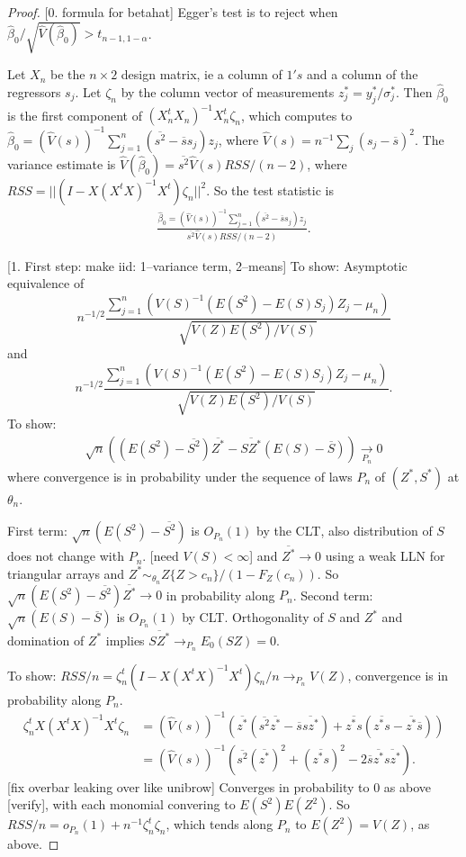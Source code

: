 \documentclass{article}
\newcommand{\E}{E}
\renewcommand{\P}{P}
\newcommand{\V}{V}
\newcommand{\mean}[1]{\overline{#1}}
\newcommand{\sel}[1]{#1^*}
\begin{document}
\begin{proof}

  [0. formula for betahat]
  Egger's test is to reject when $\hat{\beta}_0/\sqrt{\hat{\V}(\hat{\beta}_0)} > t_{n-1,1-\alpha}$.
  
  Let $X_n$ be the $n\times 2$ design matrix, ie a column of $1's$ and
  a column of the regressors $s_j$. Let $\zeta_n$ by the column vector
  of measurements $\sel z_j=\sel y_j/\sel\sigma_j$. Then
  $\hat{\beta}_0$ is the first component of
  $(X_n^tX_n)^{-1}X_n^t\zeta_n$, which computes to
  $\hat{\beta}_0=(\hat{\V}(s))^{-1}\sum_{j=1}^n(\mean{s^2}-\mean{s}s_j)z_j$,
  where $\hat{\V}(s)=n^{-1}\sum_j(s_j-\mean{s})^2$.  The variance
  estimate is
  $\hat{\V}(\hat{\beta}_0)=\mean{s^2}\hat{\V}(s)RSS/(n-2)$, where
  $RSS=||(I-X(X^tX)^{-1}X^t)\zeta_n||^2$. So the test statistic is
  \begin{align}
    \frac{\hat{\beta}_0=(\hat{\V}(s))^{-1}\sum_{j=1}^n(\mean{s^2}-\mean{s}s_j)z_j}{\mean{s^2}\hat{\V}(s)RSS/(n-2)}.
  \end{align}
  
  [1. First step: make iid: 1--variance term, 2--means]
  To show: Asymptotic equivalence of
  \[
    n^{-1/2}\frac{\sum_{j=1}^n\left(\V(S)^{-1}(\E(S^2)-\E(S)S_j)Z_j-\mu_n\right)}{\sqrt{\V(Z)\E(S^2)/\V(S)}}
    \]
  and
  \[
    n^{-1/2}\frac{\sum_{j=1}^n\left(\V(S)^{-1}(\E(S^2)-\E(S)S_j)Z_j-\mu_n\right)}{\sqrt{\V(Z)\E(S^2)/\V(S)}}.
  \]
  To show:
  \begin{align}
    \sqrt{n}\left(\left(\E(S^2)-\mean{S^2}\right)\mean{\sel{Z}} - \mean{S\sel{Z}}\left(\E(S)-\mean{S}\right)\right) \underset{P_n}{\to} 0
  \end{align}
  where convergence is in probability under the sequence of laws $\P_n$ of $(\sel Z,\sel S)$ at $\theta_n$.

  First term: $\sqrt{n}\left(\E(S^2)-\mean{S^2}\right)$ is $O_{P_n}(1)$
  by the CLT, also distribution of $S$ does not change with $P_n$. [need
  $V(S)<\infty$] and $\mean{\sel{Z}}\to 0$ using a weak LLN for
  triangular arrays and
  $\sel Z \sim_{\theta_n} Z\{Z>c_n\}/(1-F_Z(c_n))$. So
  $\sqrt{n}\left(\E(S^2)-\mean{S^2}\right)\mean{\sel{Z}}\to 0$ in
  probability along $P_n$. Second term:
  $\sqrt{n}\left(\E(S)-\mean{S}\right)$ is $O_{P_n}(1)$ by CLT. Orthogonality
  of $S$ and $\sel{Z}$ and domination of $\sel{Z}$ implies
  $\mean{S\sel{Z}}\to_{P_n}\E_0(SZ)=0$.

  To show:
  $RSS/n=\zeta_n^t(I-X(X^tX)^{-1}X^t)\zeta_n/n \to_{\P_n}\V(Z)$,
  convergence is in probability along $\P_n$. 
  \begin{align}
    \zeta_n^tX(X^tX)^{-1}X^t\zeta_n &= (\hat{\V}(s))^{-1}\left(\mean{\sel{z}}(\mean{s^2}\mean{\sel{z}}-\mean{s}\mean{s\sel{z}})+\mean{\sel{z}s}(\mean{\sel{z}s}-\mean{\sel{z}}\mean{s}) \right)\\
    &= (\hat{\V}(s))^{-1}\left(\mean{s^2}(\mean{\sel{z}})^2 + (\mean{\sel{z}s})^2 - 2\mean{s}\mean{\sel{z}}\mean{s\sel{z}}\right).
  \end{align}[fix overbar leaking over like unibrow]
  Converges in probability to $0$ as above [verify], with each
  monomial convering to $\E(S^2)\E(Z^2)$. So $RSS/n= o_{\P_n}(1)+ n^{-1}\zeta_n^t\zeta_n$, which tends along $\P_n$ to $\E(Z^2)=\V(Z)$, as above.
  

\end{proof}
\end{document}
